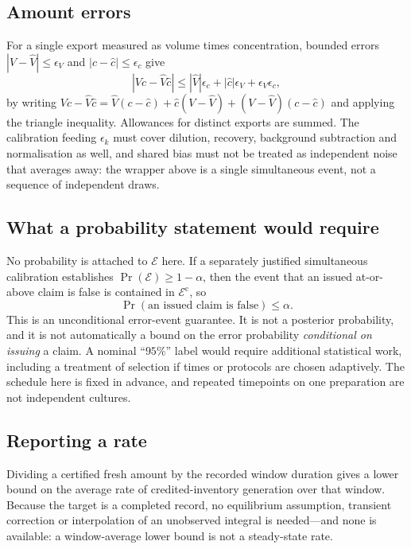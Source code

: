 \documentclass[11pt]{article}
\theoremstyle{plain}
\theoremstyle{definition}
\theoremstyle{remark}
\begin{document}
\subsection{Amount errors}

For a single export measured as volume times concentration, bounded errors
$|V-\widehat V|\le\epsilon_V$ and $|c-\widehat c|\le\epsilon_c$ give
\begin{equation}
 |Vc-\widehat V\widehat c|
 \le|\widehat V|\epsilon_c+|\widehat c|\epsilon_V+\epsilon_V\epsilon_c ,
 \label{eq:amterr}
\end{equation}
by writing $Vc-\widehat V\widehat c=
\widehat V(c-\widehat c)+\widehat c(V-\widehat V)+(V-\widehat V)(c-\widehat c)$
and applying the triangle inequality. Allowances for distinct exports are
summed. The calibration feeding $\epsilon_k$ must cover dilution, recovery,
background subtraction and normalisation as well, and shared bias must not be
treated as independent noise that averages away: the wrapper above is a single
simultaneous event, not a sequence of independent draws.

\subsection{What a probability statement would require}

No probability is attached to $\mathcal E$ here. If a separately justified
simultaneous calibration establishes $\Pr(\mathcal E)\ge1-\alpha$, then the
event that an issued at-or-above claim is false is contained in
$\mathcal E^{\mathrm c}$, so
\[
 \Pr(\text{an issued claim is false})\le\alpha .
\]
This is an unconditional error-event guarantee. It is not a posterior
probability, and it is not automatically a bound on the error probability
\emph{conditional on issuing} a claim. A nominal ``$95\%$'' label would
require additional statistical work, including a treatment of selection if
times or protocols are chosen adaptively. The schedule here is fixed in
advance, and repeated timepoints on one preparation are not independent
cultures.

\subsection{Reporting a rate}

Dividing a certified fresh amount by the recorded window duration gives a
lower bound on the average rate of credited-inventory generation over that
window. Because the target is a completed record, no equilibrium assumption,
transient correction or interpolation of an unobserved integral is needed---and
none is available: a window-average lower bound is not a steady-state rate.
\end{document}
